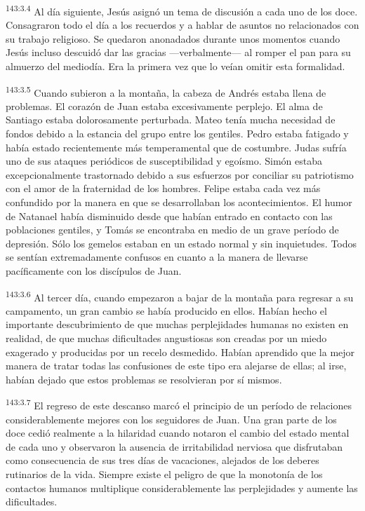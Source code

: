 \par 
\textsuperscript{143:3.4} Al día siguiente, Jesús asignó un tema de discusión a cada uno de los doce. Consagraron todo el día a los recuerdos y a hablar de asuntos no relacionados con su trabajo religioso. Se quedaron anonadados durante unos momentos cuando Jesús incluso descuidó dar las gracias ---verbalmente--- al romper el pan para su almuerzo del mediodía. Era la primera vez que lo veían omitir esta formalidad.

\par 
\textsuperscript{143:3.5} Cuando subieron a la montaña, la cabeza de Andrés estaba llena de problemas. El corazón de Juan estaba excesivamente perplejo. El alma de Santiago estaba dolorosamente perturbada. Mateo tenía mucha necesidad de fondos debido a la estancia del grupo entre los gentiles. Pedro estaba fatigado y había estado recientemente más temperamental que de costumbre. Judas sufría uno de sus ataques periódicos de susceptibilidad y egoísmo. Simón estaba excepcionalmente trastornado debido a sus esfuerzos por conciliar su patriotismo con el amor de la fraternidad de los hombres. Felipe estaba cada vez más confundido por la manera en que se desarrollaban los acontecimientos. El humor de Natanael había disminuido desde que habían entrado en contacto con las poblaciones gentiles, y Tomás se encontraba en medio de un grave período de depresión. Sólo los gemelos estaban en un estado normal y sin inquietudes. Todos se sentían extremadamente confusos en cuanto a la manera de llevarse pacíficamente con los discípulos de Juan.

\par 
\textsuperscript{143:3.6} Al tercer día, cuando empezaron a bajar de la montaña para regresar a su campamento, un gran cambio se había producido en ellos. Habían hecho el importante descubrimiento de que muchas perplejidades humanas no existen en realidad, de que muchas dificultades angustiosas son creadas por un miedo exagerado y producidas por un recelo desmedido. Habían aprendido que la mejor manera de tratar todas las confusiones de este tipo era alejarse de ellas; al irse, habían dejado que estos problemas se resolvieran por sí mismos.

\par 
\textsuperscript{143:3.7} El regreso de este descanso marcó el principio de un período de relaciones considerablemente mejores con los seguidores de Juan. Una gran parte de los doce cedió realmente a la hilaridad cuando notaron el cambio del estado mental de cada uno y observaron la ausencia de irritabilidad nerviosa que disfrutaban como consecuencia de sus tres días de vacaciones, alejados de los deberes rutinarios de la vida. Siempre existe el peligro de que la monotonía de los contactos humanos multiplique considerablemente las perplejidades y aumente las dificultades.

